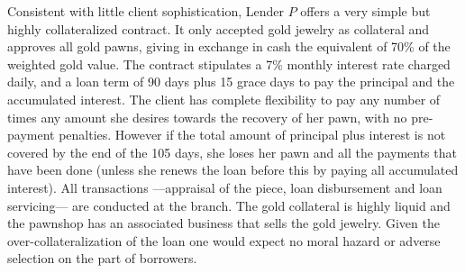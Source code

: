 \documentclass[11pt]{article}
\begin{document}
Consistent with little client sophistication, Lender $P$ offers a very simple but highly collateralized contract. It only accepted gold jewelry as collateral and approves all gold pawns, giving in exchange in cash the equivalent of 70\% of the weighted gold value. The contract stipulates a 7\% monthly interest rate charged daily, and a loan term of 90 days plus 15 grace days to pay the principal and the accumulated interest. The client has complete flexibility to pay any number of times any amount she desires towards the recovery of her pawn, with no pre-payment penalties. However if the total amount of principal plus interest is not covered by the end of the 105 days, she loses her pawn and all the payments that have been done (unless she renews the loan before this by paying all accumulated interest). All transactions ---appraisal of the piece, loan disbursement and loan servicing--- are conducted at the branch. The gold collateral is highly liquid and the pawnshop has an associated business that sells the gold jewelry. Given the over-collateralization of the loan one would expect no moral hazard or adverse selection on the part of borrowers. %
\end{document}
